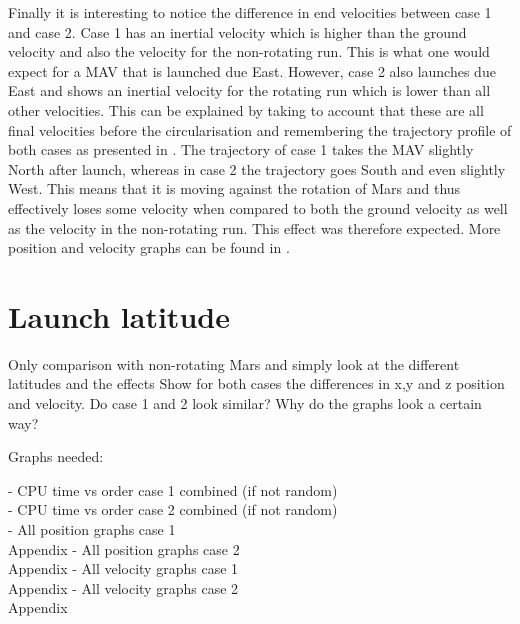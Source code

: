 \noindent
Finally it is interesting to notice the difference in end velocities between case 1 and case 2. Case 1 has an inertial velocity which is higher than the ground velocity and also the velocity for the non-rotating run. This is what one would expect for a \ac{MAV} that is launched due East. However, case 2 also launches due East and shows an inertial velocity for the rotating run which is lower than all other velocities. This can be explained by taking to account that these are all final velocities before the circularisation and remembering the trajectory profile of both cases as presented in . The trajectory of case 1 takes the \ac{MAV} slightly North after launch, whereas in case 2 the trajectory goes South and even slightly West. This means that it is moving against the rotation of Mars and thus effectively loses some velocity when compared to both the ground velocity as well as the velocity in the non-rotating run. This effect was therefore expected.
More position and velocity graphs can be found in .

%





\section{Launch latitude}
\label{sec:launchLatitude}

Only comparison with non-rotating Mars and simply look at the different latitudes and the effects
Show for both cases the differences in x,y and z position and velocity. Do case 1 and 2 look similar? Why do the graphs look a certain way?

Graphs needed:

- CPU time vs order case 1 combined (if not random) \\
- CPU time vs order case 2 combined (if not random) \\
- All position graphs case 1 \\ Appendix
- All position graphs case 2 \\ Appendix
- All velocity graphs case 1 \\ Appendix
- All velocity graphs case 2 \\ Appendix

